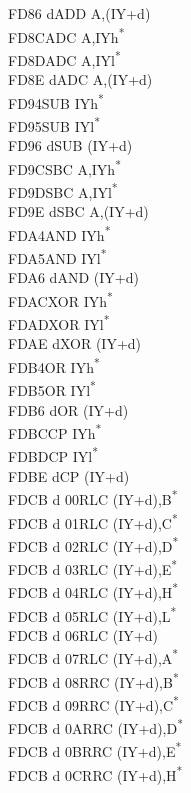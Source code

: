 \documentclass[twoside,openright,a4paper]{book}
\begin{document}
\begin{multicols}{3}
{\begin{tabbing}
	FD86 d\>ADD A,(IY+d)\\
	FD8C\>ADC A,IYh\textsuperscript{*}\\
	FD8D\>ADC A,IYl\textsuperscript{*}\\
	FD8E d\>ADC A,(IY+d)\\
	FD94\>SUB IYh\textsuperscript{*}\\
	FD95\>SUB IYl\textsuperscript{*}\\
	FD96 d\>SUB (IY+d)\\
	FD9C\>SBC A,IYh\textsuperscript{*}\\
	FD9D\>SBC A,IYl\textsuperscript{*}\\
	FD9E d\>SBC A,(IY+d)\\
	FDA4\>AND IYh\textsuperscript{*}\\
	FDA5\>AND IYl\textsuperscript{*}\\
	FDA6 d\>AND (IY+d)\\
	FDAC\>XOR IYh\textsuperscript{*}\\
	FDAD\>XOR IYl\textsuperscript{*}\\
	FDAE d\>XOR (IY+d)\\
	FDB4\>OR IYh\textsuperscript{*}\\
	FDB5\>OR IYl\textsuperscript{*}\\
	FDB6 d\>OR (IY+d)\\
	FDBC\>CP IYh\textsuperscript{*}\\
	FDBD\>CP IYl\textsuperscript{*}\\
	FDBE d\>CP (IY+d)\\
	FDCB d 00\>RLC (IY+d),B\textsuperscript{*}\\
	FDCB d 01\>RLC (IY+d),C\textsuperscript{*}\\
	FDCB d 02\>RLC (IY+d),D\textsuperscript{*}\\
	FDCB d 03\>RLC (IY+d),E\textsuperscript{*}\\
	FDCB d 04\>RLC (IY+d),H\textsuperscript{*}\\
	FDCB d 05\>RLC (IY+d),L\textsuperscript{*}\\
	FDCB d 06\>RLC (IY+d)\\
	FDCB d 07\>RLC (IY+d),A\textsuperscript{*}\\
	FDCB d 08\>RRC (IY+d),B\textsuperscript{*}\\
	FDCB d 09\>RRC (IY+d),C\textsuperscript{*}\\
	FDCB d 0A\>RRC (IY+d),D\textsuperscript{*}\\
	FDCB d 0B\>RRC (IY+d),E\textsuperscript{*}\\
	FDCB d 0C\>RRC (IY+d),H\textsuperscript{*}\\

\end{tabbing}}
\end{multicols}
\end{document}
